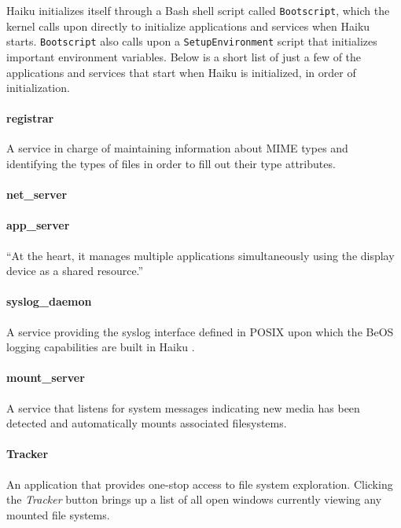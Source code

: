 \documentclass{article}
\begin{document}
Haiku initializes itself through a Bash shell script called \texttt{Bootscript}, which the kernel calls upon directly to initialize applications and services when Haiku starts. \texttt{Bootscript} also calls upon a \texttt{SetupEnvironment} script that initializes important environment variables. Below is a short list of just a few of the applications and services that start when Haiku is initialized, in order of initialization.

\paragraph{registrar}
A service in charge of maintaining information about MIME types and
identifying the types of files in order to fill out their type
attributes. \cite{RegistrarInfo}

\paragraph{net\_server}

\paragraph{app\_server}
``At the heart, it manages multiple applications simultaneously using the display device as a shared resource.''\cite{AppServer}

\paragraph{syslog\_daemon}
A service providing the syslog interface defined in POSIX upon which
the BeOS logging capabilities are built in Haiku \cite{SyslogInfo}.

\paragraph{mount\_server}
A service that listens for system messages indicating new media has been detected and automatically mounts associated filesystems.\cite{AutoMounter}

\paragraph{Tracker}
An application that provides one-stop access to file system exploration. Clicking the \textit{Tracker} button brings up a list of all open windows currently viewing any mounted file systems.\cite{Tracker}
\end{document}
